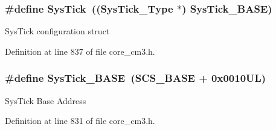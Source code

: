 \hypertarget{group___c_m_s_i_s__core__register_gacd96c53beeaff8f603fcda425eb295de}{
\subsubsection[{\-Sys\-Tick}]{\setlength{\rightskip}{0pt plus 5cm}\#define {\bf \-Sys\-Tick}~(({\bf \-Sys\-Tick\-\_\-\-Type} $\ast$)       {\bf \-Sys\-Tick\-\_\-\-B\-A\-S\-E})}}\label{group___c_m_s_i_s__core__register_gacd96c53beeaff8f603fcda425eb295de}
\-Sys\-Tick configuration struct 

\-Definition at line 837 of file core\-\_\-cm3.\-h.

\hypertarget{group___c_m_s_i_s__core__register_ga58effaac0b93006b756d33209e814646}{
\subsubsection[{\-Sys\-Tick\-\_\-\-B\-A\-S\-E}]{\setlength{\rightskip}{0pt plus 5cm}\#define {\bf \-Sys\-Tick\-\_\-\-B\-A\-S\-E}~({\bf \-S\-C\-S\-\_\-\-B\-A\-S\-E} +  0x0010\-U\-L)}}\label{group___c_m_s_i_s__core__register_ga58effaac0b93006b756d33209e814646}
\-Sys\-Tick \-Base \-Address 

\-Definition at line 831 of file core\-\_\-cm3.\-h.


